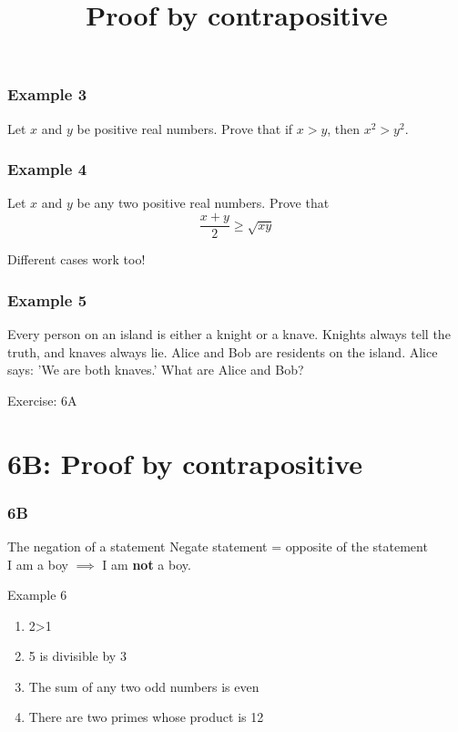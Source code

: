 \documentclass{beamer}
\begin{document}
\begin{frame}[t]
    \frametitle{Example 3}
    Let $x$ and $y$ be positive real numbers. Prove that if $x>y$, then $x^2>y^2$.
\end{frame}

\begin{frame}[t]
    \frametitle{Example 4}
    Let $x$ and $y$ be any two positive real numbers. Prove that\\
    \[
        \frac{x+y}{2} \geq \sqrt{xy}
    \]
\end{frame}

\begin{frame}[t]
    Different cases work too!\\
    \frametitle{Example 5}
    Every person on an island is either a knight or a knave. Knights always tell the truth,
 and knaves always lie. Alice and Bob are residents on the island. Alice says: 'We are
 both knaves.' What are Alice and Bob?    
\end{frame}

\begin{frame}{Exercise: 6A}
\end{frame}

\section{6B: Proof by contrapositive}
\begin{frame} 
    \frametitle{6B}
    \begin{center}
        \title{Proof by contrapositive}
        \maketitle
    \end{center}
\end{frame}

\begin{frame}{The negation of a statement}
    Negate statement = opposite of the statement\\
    I am a boy $\implies$ I am \textbf{not} a boy.
    \begin{block}{Example 6}
        \begin{enumerate}
            \item 2>1
            \item 5 is divisible by 3
            \item The sum of any two odd numbers is even
            \item There are two primes whose product is 12
        \end{enumerate}        
    \end{block}
\end{frame}
\end{document}
